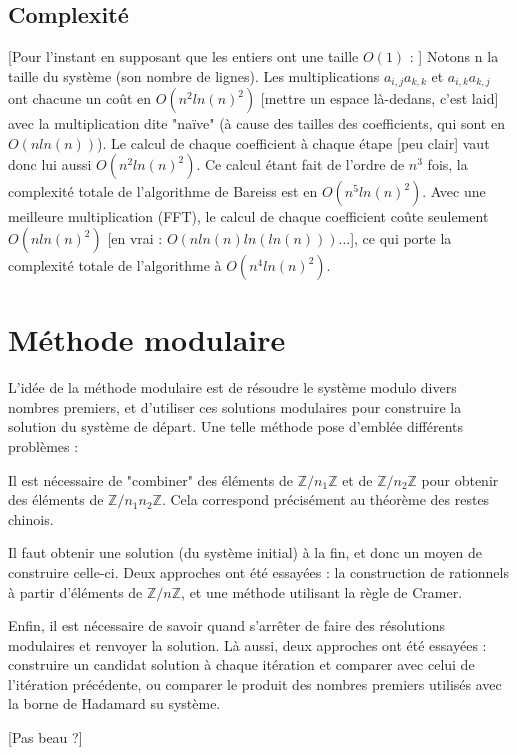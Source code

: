 \documentclass[french]{article}
\begin{document}
\subsection{Complexité}
[Pour l'instant en supposant que les entiers ont une taille $O(1)$ : ]
\newline
Notons n la taille du système (son nombre de lignes). Les multiplications $a_{i,j} a_{k,k}$ et $a_{i,k} a_{k,j}$ ont chacune un coût en $O(n^2 ln(n)^2)$ [mettre un espace là-dedans, c'est laid] avec la multiplication dite "naïve" (à cause des tailles des coefficients, qui sont en $O(n ln(n))$). Le calcul de chaque coefficient à chaque étape [peu clair] vaut donc lui aussi $O(n^2 ln(n)^2)$. Ce calcul étant fait de l'ordre de $n^3$ fois, la complexité totale de l'algorithme de Bareiss est en $O(n^5 ln(n)^2)$. Avec une meilleure multiplication (FFT), le calcul de chaque coefficient coûte seulement $O(n ln(n)^2)$ [en vrai : $O(n ln(n) ln(ln(n)))$...], ce qui porte la complexité totale de l'algorithme à $O(n^4 ln(n)^2)$.
\section{Méthode modulaire}
L'idée de la méthode modulaire est de résoudre le système modulo divers nombres premiers, et d'utiliser ces solutions modulaires pour construire la solution du système de départ. Une telle méthode pose d'emblée différents problèmes :
\begin{description}
	\item Il est nécessaire de "combiner" des éléments de $\mathbb{Z}/n_1\mathbb{Z}$ et de $\mathbb{Z}/n_2\mathbb{Z}$ pour obtenir des éléments de $\mathbb{Z}/n_1n_2\mathbb{Z}$. Cela correspond précisément au théorème des restes chinois.
	\item Il faut obtenir une solution (du système initial) à la fin, et donc un moyen de construire celle-ci. Deux approches ont été essayées : la construction de rationnels à partir d'éléments de $\mathbb{Z}/n\mathbb{Z}$, et une méthode utilisant la règle de Cramer.
	\item Enfin, il est nécessaire de savoir quand s'arrêter de faire des résolutions modulaires et renvoyer la solution. Là aussi, deux approches ont été essayées : construire un candidat solution à chaque itération et comparer avec celui de l'itération précédente, ou comparer le produit des nombres premiers utilisés avec la borne de Hadamard su système.
\end{description}
[Pas beau ?]
\end{document}
